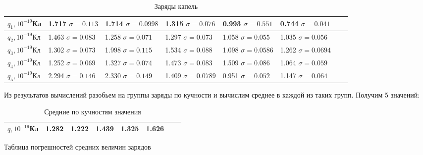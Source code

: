 \documentclass[a4paper,12pt]{article}
\begin{document}
\begin{table}[h]
    \centering
    \begin{center}
    \caption{Заряды капель}
    \end{center}
    \vspace{0.1cm}
    \label{tab:my_label}
    \begin{tabular}{ |p{2.7cm}||p{2.7cm}|p{2.7cm}|p{2.7cm}|p{2.7cm}|p{2.7cm}|p{2.7cm}|p{2.7cm}| }
 \hline
    $q_{1}, 10^{-19}$Кл & 1.717  $\sigma = 0.113$ & 1.714  $\sigma = 0.0998$ & 1.315  $\sigma = 0.076$ & 0.993   $\sigma = 0.551$ & 0.744  $\sigma = 0.041$\\
\hline
    $q_{2}, 10^{-19}$Кл & 1.463  $\sigma = 0.083$ & 1.258  $\sigma = 0.071$ & 1.297  $\sigma = 0.073$ & 1.058  $\sigma = 0.055$ & 1.035  $\sigma = 0.056$\\   
\hline
    $q_{3}, 10^{-19}$Кл & 1.302  $\sigma = 0.073$ & 1.998  $\sigma = 0.115$ & 1.534  $\sigma = 0.088$ & 1.098  $\sigma = 0.0586$ & 1.262  $\sigma = 0.0694$\\
\hline
    $q_{4}, 10^{-19}$Кл & 1.252  $\sigma = 0.069$ & 1.327  $\sigma = 0.074$ & 1.473  $\sigma = 0.083$ & 1.509  $\sigma = 0.086$ & 1.064  $\sigma = 0.059$\\

\hline
	$q_{5}, 10^{-19}$Кл & 2.294  $\sigma = 0.146$ & 2.330  $\sigma = 0.149$ & 1.409  $\sigma = 0.0789$ & 0.951  $\sigma = 0.052$ & 1.147  $\sigma = 0.064$\\
\hline
    \end{tabular}
\end{table}
Из результатов вычислений разобьем на группы заряды по кучности и вычислим среднее в каждой из таких групп. Получим 5 значений:
\newpage
\par
\begin{table}[h]
    \centering
    \begin{center}
    \caption{Средние по кучностям значения}
    \end{center}
    \vspace{0.1cm}
    \label{tab:my_label}
    \begin{tabular}{ |p{2cm}||p{1.2cm}|p{1.2cm}|p{1.2cm}|p{}|p{1.2cm}|p{1.2cm}|p{1.2cm}| }
 \hline  
    $q, 10^{-19}$Кл & 1.282 & 1.222 & 1.439 & 1.325 & 1.626\\
\hline

    \end{tabular}
\end{table}
\par Таблица погрешностей средних величин зарядов 
\end{document}
